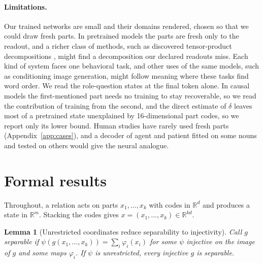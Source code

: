 \documentclass[10pt]{article}
\theoremstyle{plain}
\newtheorem{lemma}{Lemma}
\theoremstyle{remark}
\newcommand{\R}{\mathbb{R}}
\begin{document}
\paragraph{Limitations.} Our trained networks are small and their domains rendered, chosen so that we could draw fresh parts. In pretrained models the parts are fresh only to the readout, and a richer class of methods, such as discovered tensor-product decompositions \citep{soulos2020}, might find a decomposition our declared readouts miss. Each kind of system faces one behavioral task, and other uses of the same models, such as conditioning image generation, might follow meaning where these tasks find word order. We read the role-question states at the final token alone. In causal models the first-mentioned part needs no training to stay recoverable, so we read the contribution of training from the second, and the direct estimate of $\delta$ leaves most of a pretrained state unexplained by 16-dimensional part codes, so we report only its lower bound. Human studies have rarely used fresh parts (Appendix~\ref{app:cases}), and a decoder of agent and patient \citep{frankland2015} fitted on some nouns and tested on others would give the neural analogue.

\FloatBarrier



\clearpage
\appendix
\makeatletter\let\@fb@secFB\relax\makeatother %

\section{Formal results}
\label{app:proofs}

Throughout, a relation acts on parts $x_1, \ldots, x_k$ with codes in $\R^d$ and produces a state in $\R^m$. Stacking the codes gives $x = (x_1, \ldots, x_k) \in \R^{kd}$.



\begin{lemma}[Unrestricted coordinates reduce separability to injectivity]
\label{lem:psi}
Call $g$ separable if $\psi(g(x_1, \ldots, x_k)) = \sum_i \varphi_i(x_i)$ for some $\psi$ injective on the image of $g$ and some maps $\varphi_i$. If $\psi$ is unrestricted, every injective $g$ is separable.
\end{lemma}
\end{document}
